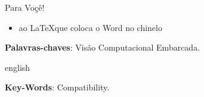 \documentclass{ifscTCC} %
\begin{document}
\begin{dedicatoria}

    \vspace*{\fill}
        Para Voçê!
    \vspace*{\fill}
    
\end{dedicatoria}


\begin{agradecimentos}
    \begin{itemize}
        \item ao \LaTeX que coloca o Word no chinelo 
    \end{itemize}

\end{agradecimentos}


%	
%    

\setlength{\absparsep}{18pt} %

\begin{resumo}



\noindent
\textbf{Palavras-chaves}: Visão Computacional Embarcada. 

\end{resumo}

\begin{resumo}[ABSTRACT]
\begin{otherlanguage*}{english}



\noindent
\textbf{Key-Words}: Compatibility. 
\end{otherlanguage*}
\end{resumo}
\end{document}
